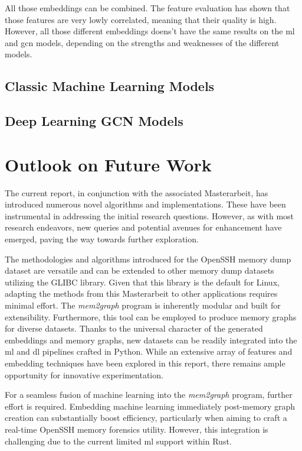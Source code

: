 All those embeddings can be combined. The feature evaluation has shown that those features are very lowly correlated, meaning that their quality is high. However, all those different embeddings doens't have the same results on the \acrshort{ml} and \acrshort{gcn} models, depending on the strengths and weaknesses of the different models.

\subsection{Classic Machine Learning Models}

\subsection{Deep Learning GCN Models}


\section{Outlook on Future Work}\label{conclusion:sec:future_work}


The current report, in conjunction with the associated Masterarbeit, has introduced numerous novel algorithms and implementations. These have been instrumental in addressing the initial research questions. However, as with most research endeavors, new queries and potential avenues for enhancement have emerged, paving the way towards further exploration.

The methodologies and algorithms introduced for the OpenSSH memory dump dataset are versatile and can be extended to other memory dump datasets utilizing the GLIBC library. Given that this library is the default for Linux, adapting the methods from this Masterarbeit to other applications requires minimal effort. The \textit{mem2graph} program is inherently modular and built for extensibility. Furthermore, this tool can be employed to produce memory graphs for diverse datasets. Thanks to the universal character of the generated embeddings and memory graphs, new datasets can be readily integrated into the \acrshort{ml} and \acrshort{dl} pipelines crafted in Python. While an extensive array of features and embedding techniques have been explored in this report, there remains ample opportunity for innovative experimentation.

For a seamless fusion of machine learning into the \textit{mem2graph} program, further effort is required. Embedding machine learning immediately post-memory graph creation can substantially boost efficiency, particularly when aiming to craft a real-time OpenSSH memory forensics utility. However, this integration is challenging due to the current limited \acrshort{ml} support within Rust.

